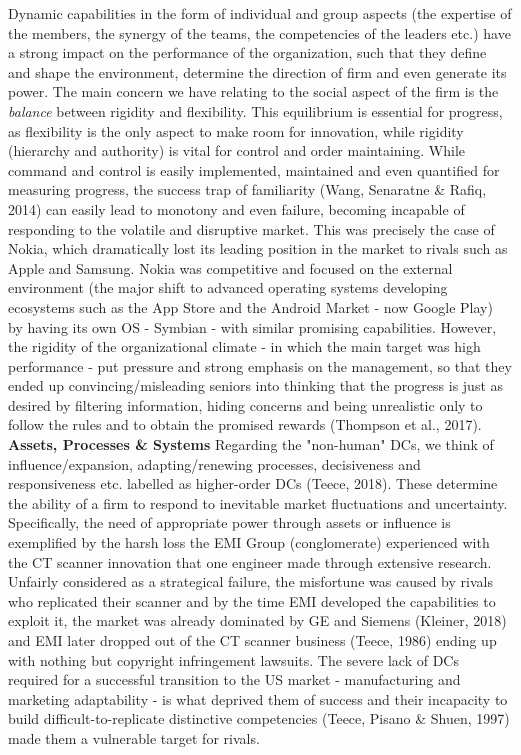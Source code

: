 \documentclass[11pt]{article}
\begin{document}
Dynamic capabilities in the form of individual and group aspects (the expertise of the members, the synergy of the teams, the competencies of the leaders etc.) have a strong impact on the performance of the organization, such that they define and shape the environment, determine the direction of firm and even generate its power. The main concern we have relating to the social aspect of the firm is the \emph{balance} between rigidity and flexibility. This equilibrium is essential for progress, as flexibility is the only aspect to make room for innovation, while rigidity (hierarchy and authority) is vital for control and order maintaining. While command and control is easily implemented, maintained and even quantified for measuring progress, the success trap of familiarity (Wang, Senaratne \& Rafiq, 2014) can easily lead to monotony and even failure, becoming incapable of responding to the volatile and disruptive market. This was precisely the case of Nokia, which dramatically lost its leading position in the market to rivals such as Apple and Samsung. Nokia was competitive and focused on the external environment (the major shift to advanced operating systems developing ecosystems such as the App Store and the Android Market - now Google Play) by having its own OS - Symbian - with similar promising capabilities. However, the rigidity of the organizational climate -  in which the main target was high performance - put pressure and strong emphasis on the management, so that they ended up convincing/misleading seniors into thinking that the progress is just as desired by filtering information, hiding concerns and being unrealistic only to follow the rules and to obtain the promised rewards (Thompson et al., 2017). 
\newline \newline
\textbf{Assets, Processes \& Systems} \newline \newline
Regarding the "non-human" DCs, we think of influence/expansion, adapting/renewing processes, decisiveness and responsiveness etc. labelled as higher-order DCs (Teece, 2018). These determine the ability of a firm to respond to inevitable market fluctuations and uncertainty. Specifically, the need of appropriate power through assets or influence is exemplified by the harsh loss the EMI Group (conglomerate) experienced with the CT scanner innovation that one engineer made through extensive research. Unfairly considered as a strategical failure, the misfortune was caused by rivals who replicated their scanner and by the time EMI developed the capabilities to exploit it, the market was already dominated by GE and Siemens (Kleiner, 2018) and EMI later dropped out of the CT scanner business (Teece, 1986) ending up with nothing but copyright infringement lawsuits. The severe lack of DCs required for a successful transition to the US market - manufacturing and marketing adaptability - is what deprived them of success and their incapacity to build difficult-to-replicate distinctive competencies (Teece, Pisano \& Shuen, 1997) made them a vulnerable target for rivals.
\end{document}
